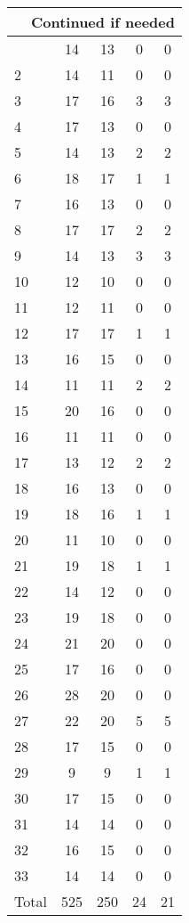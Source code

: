\begin{center}
\begin{longtable}{l|c|c|c|c}
\hline \multicolumn{5}{|r|}{{Continued if needed}} \\ \hline
\endfoot 
1 & 14 & 13 & 0 & 0\\ \hline
2 & 14 & 11 & 0 & 0\\ \hline
3 & 17 & 16 & 3 & 3\\ \hline
4 & 17 & 13 & 0 & 0\\ \hline
5 & 14 & 13 & 2 & 2\\ \hline
6 & 18 & 17 & 1 & 1\\ \hline
7 & 16 & 13 & 0 & 0\\ \hline
8 & 17 & 17 & 2 & 2\\ \hline
9 & 14 & 13 & 3 & 3\\ \hline
10 & 12 & 10 & 0 & 0\\ \hline
11 & 12 & 11 & 0 & 0\\ \hline
12 & 17 & 17 & 1 & 1\\ \hline
13 & 16 & 15 & 0 & 0\\ \hline
14 & 11 & 11 & 2 & 2\\ \hline
15 & 20 & 16 & 0 & 0\\ \hline
16 & 11 & 11 & 0 & 0\\ \hline
17 & 13 & 12 & 2 & 2\\ \hline
18 & 16 & 13 & 0 & 0\\ \hline
19 & 18 & 16 & 1 & 1\\ \hline
20 & 11 & 10 & 0 & 0\\ \hline
21 & 19 & 18 & 1 & 1\\ \hline
22 & 14 & 12 & 0 & 0\\ \hline
23 & 19 & 18 & 0 & 0\\ \hline
24 & 21 & 20 & 0 & 0\\ \hline
25 & 17 & 16 & 0 & 0\\ \hline
26 & 28 & 20 & 0 & 0\\ \hline
27 & 22 & 20 & 5 & 5\\ \hline
28 & 17 & 15 & 0 & 0\\ \hline
29 & 9 & 9 & 1 & 1\\ \hline
30 & 17 & 15 & 0 & 0\\ \hline
31 & 14 & 14 & 0 & 0\\ \hline
32 & 16 & 15 & 0 & 0\\ \hline
33 & 14 & 14 & 0 & 0\\ \hline
\hline \hline
Total & 525 & 250 & 24 & 21



\end{longtable}
\end{center}

